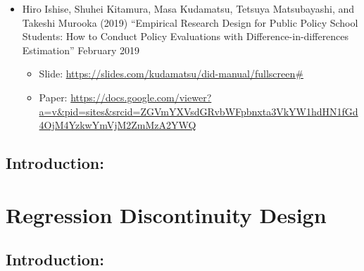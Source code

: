 \documentclass[]{book}
\providecommand{\tightlist}{%
  \setlength{\itemsep}{0pt}\setlength{\parskip}{0pt}}
\begin{document}
\begin{itemize}
\tightlist
\item
  Hiro Ishise, Shuhei Kitamura, Masa Kudamatsu, Tetsuya Matsubayashi,
  and Takeshi Murooka (2019) ``Empirical Research Design for Public
  Policy School Students: How to Conduct Policy Evaluations with
  Difference-in-differences Estimation'' February 2019

  \begin{itemize}
  \tightlist
  \item
    Slide: \url{https://slides.com/kudamatsu/did-manual/fullscreen\#}\\
  \item
    Paper:
    \url{https://docs.google.com/viewer?a=v\&pid=sites\&srcid=ZGVmYXVsdGRvbWFpbnxta3VkYW1hdHN1fGd4OjM4YzkwYmVjM2ZmMzA2YWQ}
  \end{itemize}
\end{itemize}

\section{Introduction:}\label{introduction-5}

\chapter{Regression Discontinuity
Design}\label{regression-discontinuity-design}

\section{Introduction:}\label{introduction-6}
\end{document}
